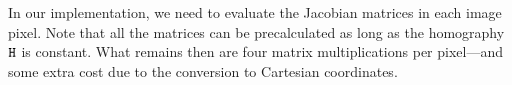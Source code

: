 In our implementation, we need to evaluate the Jacobian matrices in each image pixel.
Note that all the matrices can be precalculated as long as the homography $\mathtt{H}$ is constant.
What remains then are four matrix multiplications per pixel---and some extra cost due to the conversion to Cartesian coordinates.

